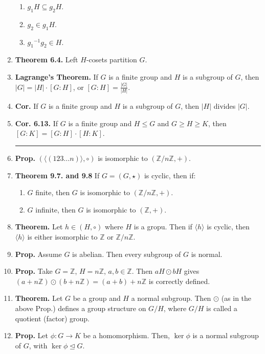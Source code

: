 \begin{enumerate}
\begin{enumerate}
		\item $g_1H \subseteq g_2H$. 
		\item $g_2 \in g_1H$. 
		\item ${g_1}^{-1}g_2 \in H$. 
	\end{enumerate} 
	\item \textbf{Theorem 6.4. } Left $H$-cosets partition $G$. 
	\item \textbf{Lagrange's Theorem. } If $G$ is a finite group and $H$ is a subgroup of $G$, then $|G| = |H| \cdot [G:H]$, or $[G:H] = \frac{|G|}{|H|}$. 
	\item \textbf{Cor. } If $G$ is a finite group and $H$ is a subgroup of $G$, then $|H|$ divides $|G|$. 
	\item \textbf{Cor. 6.13. } If $G$ is a finite group and $H \leq G$ and $G \geq H \geq K$, then $[G:K] = [G:H] \cdot [H:K]$.
	\begin{center}
		\hrule
	\end{center}
	\item \textbf{Prop. } $(\langle (123 \dots n) \rangle, \circ)$ is isomorphic to $(\mathbb{Z}/n\mathbb{Z},+)$. 
	\item \textbf{Theorem 9.7. and 9.8} If $G = (G, \star)$ is cyclic, then if: 
	\begin{enumerate}
		\item $G$ finite, then $G$ is isomorphic to $(\mathbb{Z}/n\mathbb{Z}, +)$. 
		\item $G$ infinite, then $G$ is isomorphic to $(\mathbb{Z},+)$. 
	\end{enumerate}
	\item \textbf{Theorem. } Let $h \in (H,\circ)$ where $H$ is a gropu. Then if $\langle h \rangle$ is cyclic, then $\langle h \rangle$ is either isomorphic to $\mathbb{Z}$ or $\mathbb{Z}/n\mathbb{Z}$. 
	\item \textbf{Prop. } Assume $G$ is abelian. Then every subgroup of $G$ is normal. 
	\item \textbf{Prop. } Take $G = \mathbb{Z}$, $H = n\mathbb{Z}$, $a,b \in \mathbb{Z}$. Then $aH \odot bH$ gives $(a+n\mathbb{Z}) \odot (b+n\mathbb{Z}) = (a + b) + n\mathbb{Z}$ is correctly defined. 
	\item \textbf{Theorem. } Let $G$ be a group and $H$ a normal subgroup. Then $\odot$ (as in the above Prop.) defines a group structure on $G/H$, where $G/H$ is called a quotient (factor) group. 
	\item \textbf{Prop. } Let $\phi: G \to K$ be a homomorphism. Then, $\ker \phi$ is a normal subgroup of $G$, with $\ker\phi \unlhd G$. 

\end{enumerate}

